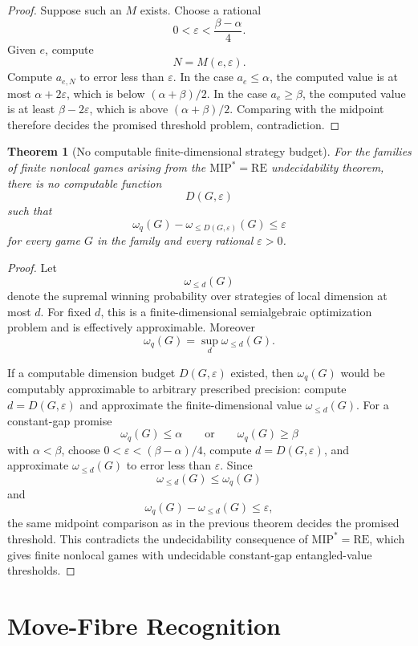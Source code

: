 \documentclass[11pt]{article}
\newtheorem{theorem}{Theorem}[section]
\begin{document}
\begin{proof}
Suppose such an \(M\) exists. Choose a rational
\[
0<\varepsilon<\frac{\beta-\alpha}{4}.
\]
Given \(e\), compute
\[
N=M(e,\varepsilon).
\]
Compute \(a_{e,N}\) to error less than \(\varepsilon\). In the case \(a_e\leq\alpha\), the computed value is at most \(\alpha+2\varepsilon\), which is below \((\alpha+\beta)/2\). In the case \(a_e\geq\beta\), the computed value is at least \(\beta-2\varepsilon\), which is above \((\alpha+\beta)/2\). Comparing with the midpoint therefore decides the promised threshold problem, contradiction.
\end{proof}

\begin{theorem}[No computable finite-dimensional strategy budget]
For the families of finite nonlocal games arising from the \( \mathrm{MIP}^{\ast}=\mathrm{RE}\) undecidability theorem, there is no computable function
\[
D(G,\varepsilon)
\]
such that
\[
\omega_q(G)-\omega_{\leq D(G,\varepsilon)}(G)\leq\varepsilon
\]
for every game \(G\) in the family and every rational \(\varepsilon>0\).
\end{theorem}

\begin{proof}
Let
\[
\omega_{\leq d}(G)
\]
denote the supremal winning probability over strategies of local dimension at most \(d\). For fixed \(d\), this is a finite-dimensional semialgebraic optimization problem and is effectively approximable. Moreover
\[
\omega_q(G)=\sup_d\omega_{\leq d}(G).
\]

If a computable dimension budget \(D(G,\varepsilon)\) existed, then \(\omega_q(G)\) would be computably approximable to arbitrary prescribed precision: compute \(d=D(G,\varepsilon)\) and approximate the finite-dimensional value \(\omega_{\leq d}(G)\). For a constant-gap promise
\[
\omega_q(G)\leq\alpha
\qquad\text{or}\qquad
\omega_q(G)\geq\beta
\]
with \(\alpha<\beta\), choose \(0<\varepsilon<(\beta-\alpha)/4\), compute \(d=D(G,\varepsilon)\), and approximate \(\omega_{\leq d}(G)\) to error less than \(\varepsilon\). Since
\[
\omega_{\leq d}(G)\leq \omega_q(G)
\]
and
\[
\omega_q(G)-\omega_{\leq d}(G)\leq\varepsilon,
\]
the same midpoint comparison as in the previous theorem decides the promised threshold. This contradicts the undecidability consequence of \( \mathrm{MIP}^{\ast}=\mathrm{RE}\), which gives finite nonlocal games with undecidable constant-gap entangled-value thresholds.
\end{proof}

\section{Move-Fibre Recognition}
\end{document}
